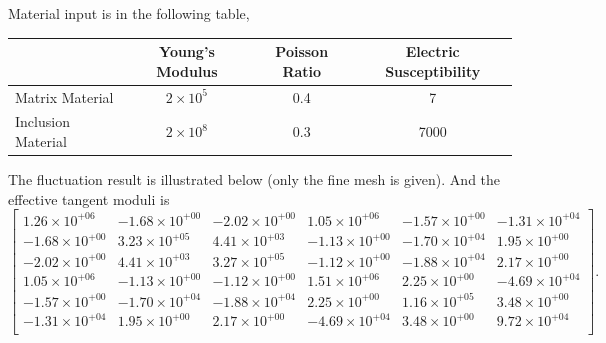 Material input is in the following table,
\begin{center}
\begin{tabular}{l|c|c|c}
\hline
& Young's Modulus & Poisson Ratio & Electric Susceptibility\\
\hline
Matrix Material & $2\times 10^{5}$ & 0.4 & 7 \\
Inclusion Material & $2\times 10^{8}$ & 0.3 & 7000 \\
\hline
\end{tabular}
\end{center}

The fluctuation result is illustrated below (only the fine mesh is given). And the effective tangent moduli is
\[
\begin{bmatrix}
1.26 \times 10^{+06} & -1.68 \times 10^{+00} & -2.02 \times 10^{+00} & 1.05 \times 10^{+06} & -1.57 \times 10^{+00} & -1.31 \times 10^{+04}\\ 
-1.68 \times 10^{+00} & 3.23 \times 10^{+05} & 4.41 \times 10^{+03} & -1.13 \times 10^{+00} & -1.70 \times 10^{+04} & 1.95 \times 10^{+00}\\ 
-2.02 \times 10^{+00} & 4.41 \times 10^{+03} & 3.27 \times 10^{+05} & -1.12 \times 10^{+00} & -1.88 \times 10^{+04} & 2.17 \times 10^{+00}\\ 
1.05 \times 10^{+06} & -1.13 \times 10^{+00} & -1.12 \times 10^{+00} & 1.51 \times 10^{+06} & 2.25 \times 10^{+00} & -4.69 \times 10^{+04}\\ 
-1.57 \times 10^{+00} & -1.70 \times 10^{+04} & -1.88 \times 10^{+04} & 2.25 \times 10^{+00} & 1.16 \times 10^{+05} & 3.48 \times 10^{+00}\\ 
-1.31 \times 10^{+04} & 1.95 \times 10^{+00} & 2.17 \times 10^{+00} & -4.69 \times 10^{+04} & 3.48 \times 10^{+00} & 9.72 \times 10^{+04}\\  
\end{bmatrix}.
\]

